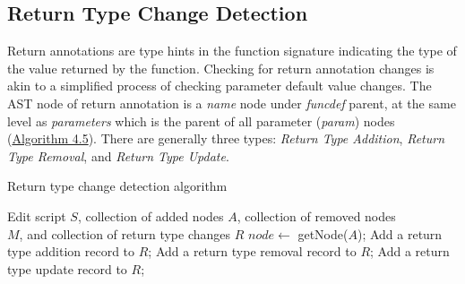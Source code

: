 \subsection{Return Type Change Detection}

Return annotations are type hints in the function signature indicating the type of the value returned by the function. Checking for return annotation changes is akin to a simplified process of checking parameter default value changes. The AST node of return annotation is a \textit{name} node under \textit{funcdef} parent, at the same level as \textit{parameters} which is the parent of all parameter (\textit{param}) nodes (\hyperref[algo:return-change-detect]{Algorithm 4.5}). There are generally three types: \textit{Return Type Addition}, \textit{Return Type Removal}, and \textit{Return Type Update}.

\begin{algorithm}
	\caption{Return type change detection algorithm}
	\label{algo:return-change-detect}
	\begin{algorithmic}
		\REQUIRE Edit script $S$, collection of added nodes $A$, collection of removed nodes \\
		$M$, and collection of return type changes $R$
			\STATE $node \gets$ getNode($A$);
					\STATE Add a return type addition record to $R$;
					\STATE Add a return type removal record to $R$;
					\STATE Add a return type update record to $R$;
				\ENDIF
			\ENDIF
		\ENDFOR
	\end{algorithmic}
\end{algorithm}
